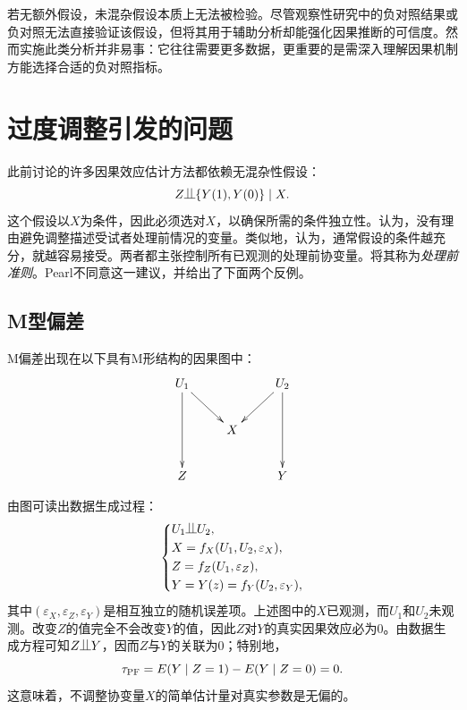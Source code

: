 若无额外假设，未混杂假设本质上无法被检验。尽管观察性研究中的负对照结果或负对照无法直接验证该假设，但将其用于辅助分析却能强化因果推断的可信度。然而实施此类分析并非易事：它往往需要更多数据，更重要的是需深入理解因果机制方能选择合适的负对照指标。 

 
 


\section{过度调整引发的问题}
\label{sec::pearl-bias}

此前讨论的许多因果效应估计方法都依赖无混杂性假设：$$
Z\ind \{ Y(1), Y(0) \} \mid X .
$$这个假设以$X$为条件，因此必须选对$X$，以确保所需的条件独立性。\citet{rosenbaum2002design}认为，没有理由避免调整描述受试者处理前情况的变量。类似地，\citet{rubin2007design}认为，通常假设的条件越充分，就越容易接受。两者都主张控制所有已观测的处理前协变量。\citet{vanderweele2011new}将其称为{\it 处理前准则}。Pearl不同意这一建议，并给出了下面两个反例。 


\subsection{M型偏差}
\label{section::m-bias}

M偏差出现在以下具有M形结构的因果图中：$$
\xymatrix{
U_1 \ar[dd]\ar[dr] &&U_2 \ar[dd]\ar[dl] \\
&X& \\
Z   && Y 
}
$$

由图可读出数据生成过程：$$
\left\{ 
\begin{aligned}
&U_1 \ind U_2 ,\\
&X = f_X(U_1, U_2, \varepsilon_X),\\
&Z=   f_Z(U_1,  \varepsilon_Z) , \\
&Y=      Y(z) =  f_Y(U_2, \varepsilon_Y) ,
\end{aligned}
\right. 
$$其中$(\varepsilon_X, \varepsilon_Z, \varepsilon_Y) $是相互独立的随机误差项。上述图中的$X$已观测，而$U_1$和$U_2$未观测。改变$Z$的值完全不会改变$Y$的值，因此$Z$对$Y$的真实因果效应必为$0$。由数据生成方程可知$Z\ind Y$，因而$Z$与$Y$的关联为$0$；特别地，$$
\tau_\textsc{PF} = E(Y\mid Z=1) - E(Y\mid Z=0) = 0.
$$这意味着，不调整协变量$X$的简单估计量对真实参数是无偏的。 


